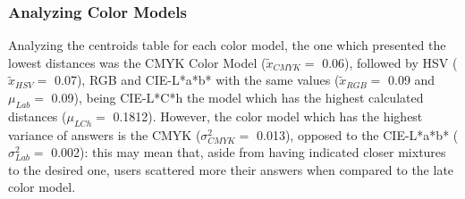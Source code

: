 \subsubsection{Analyzing Color Models}
\label{subsubsec:models_analyzing}
%
Analyzing the centroids table for each color model, the one which presented the lowest distances was the CMYK Color Model ($\tilde{x}_{CMYK} = $ 0.06), followed by HSV ($\tilde{x}_{HSV} = $ 0.07), RGB and CIE-L*a*b* with the
same values ($\tilde{x}_{RGB} = $ 0.09 and $\mu_{Lab} = $ 0.09), being CIE-L*C*h the model which has the highest calculated distances ($\mu_{LCh} = $ 0.1812). However, the color model which has the highest variance of answers is the
CMYK ($\sigma^2_{CMYK} = $ 0.013), opposed to the CIE-L*a*b* ($\sigma^2_{Lab} = $ 0.002): this may mean that, aside from having indicated closer mixtures to the desired one, users scattered more their answers when compared to the late color model. \par
%
